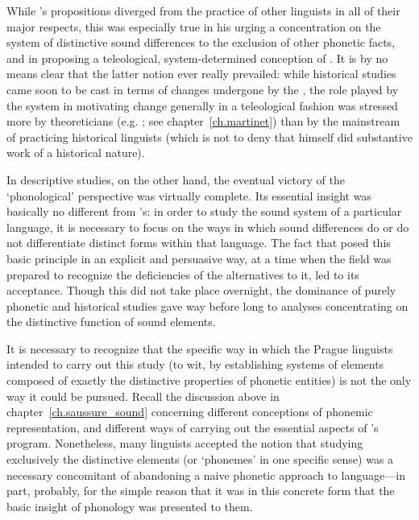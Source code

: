 While {\Jakobson}'s propositions diverged from the practice of other
linguists in all of their major respects, this was especially true in
his urging a concentration on the system of distinctive sound
differences to the exclusion of other phonetic facts, and in proposing
a teleological, system-determined conception of . It
is by no means clear that the latter notion ever really prevailed:
while historical studies came soon to be cast in terms of changes
undergone by the , the role played by the system in
motivating change generally in a teleological fashion was stressed
more by theoreticians (e.g. \citealt{martinet55:economie}; see
chapter~\ref{ch.martinet}) than by the mainstream of practicing
historical linguists (which is not to deny that {\Martinet} himself did
substantive work of a historical nature).

In descriptive studies, on the other hand, the eventual victory of the
`phonological' perspective was virtually complete. Its essential
insight was basically no different from {\Saussure}'s: in order to study
the sound system of a particular language, it is necessary to focus on
the ways in which sound differences do or do not differentiate
distinct forms within that language. The fact that {\Jakobson} posed this
basic principle in an explicit and persuasive way, at a time when the
field was prepared to recognize the deficiencies of the alternatives
to it, led to its acceptance. Though this did not take place
overnight, the dominance of purely phonetic and historical studies
gave way before long to analyses concentrating on the distinctive
function of sound elements.

It is necessary to recognize that the specific way in which the Prague
linguists intended to carry out this study (to wit, by establishing
systems of elements composed of exactly the distinctive properties of
phonetic entities) is not the only way it could be pursued. Recall the
discussion above in chapter~\ref{ch.saussure_sound} concerning
different conceptions of phonemic representation, and different ways
of carrying out the essential aspects of {\Saussure}'s
program. Nonetheless, many linguists accepted the notion that studying
exclusively the distinctive elements (or `phonemes' in one specific
sense) was a necessary concomitant of abandoning a naive phonetic
approach to language—in part, probably, for the simple reason that it
was in this concrete form that the basic insight of phonology was
presented to them.

